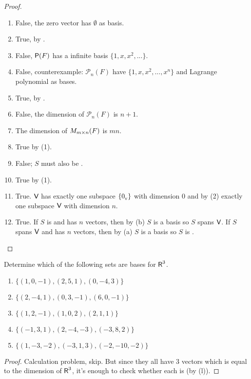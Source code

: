 \begin{proof}\ 
\begin{enumerate}
\item False, the zero vector has \(\emptyset\) as basis.
\item True, by .
\item False, \(\textsf{P}(F)\) has a infinite basis \(\{ 1, x, x^2, ... \}\).
\item False, counterexample: \(\mathcal{P}_n(F)\) have \(\{ 1, x, x^2, ..., x^n \}\) and Lagrange polynomial as bases.
\item True, by \CORO{1.10.1}.
\item False, the dimension of \(\mathcal{P}_n(F)\) is \(n + 1\).
\item The dimension of \(M_{m \times n}(F)\) is \(mn\).
\item True by (1).
\item False; \(S\) must also be \LID{}.
\item True by (1).
\item True. \(\textsf{V}\) has exactly one subspace \(\{ 0_{_{\textsf{V}}} \}\) with dimension \(0\) and by (2) exactly one subspace \(\textsf{V}\) with dimension \(n\).
\item True.
    If \(S\) is \LID{} and has \(n\) vectors, then by (b) \(S\) is a basis so \(S\) spans \(\textsf{V}\).
    If \(S\) spans \(\textsf{V}\) and has \(n\) vectors, then by \CORO{1.10.3}(a) \(S\) is a basis so \(S\) is \LID{}. 
\end{enumerate}
\end{proof}

\begin{exercise} \label{exercise 1.6.2}
Determine which of the following sets are bases for \(\textsf{R}^3\).
\begin{enumerate}
\item \(\{ (1 , 0, -1), (2, 5, 1), (0, -4, 3) \}\)
\item \(\{ (2, -4, 1), (0, 3, -1), (6, 0, -1) \}\)
\item \(\{ (1, 2, -1), (1, 0, 2), (2, 1, 1) \}\)
\item \(\{ (-1, 3, 1),(2, -4, -3),(-3, 8 ,2) \}\)
\item \(\{ (1, -3, -2), (-3, 1, 3), (-2, -10, -2) \}\)
\end{enumerate}
\end{exercise}

\begin{proof}
Calculation problem, skip.
But since they all have \(3\) vectors which is equal to the dimension of \(\textsf{R}^3\), it's enough to check whether each is \LID{} (by (l)).
\end{proof}

